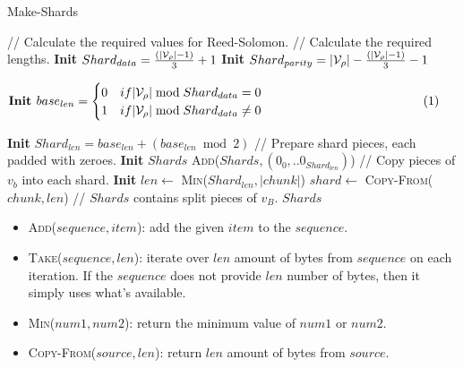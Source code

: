 \begin{algorithm}[H]
  \caption[]{\sc Make-Shards}
  \label{algo-make-shards}
  \begin{algorithmic}[1]
    \Statex // Calculate the required values for Reed-Solomon.
    \Statex // Calculate the required lengths.
    \State \textbf{Init} $Shard_{data} = \frac{(|\mathcal{V}_\rho| - 1)}{3} + 1$
    \State \textbf{Init} $Shard_{parity} = |\mathcal{V}_\rho| - \frac{(|\mathcal{V}_\rho| - 1)}{3} - 1$
    \State $\vcenter{
      \begin{flalign*}
        &\textbf{Init } base_{len} =
        \begin{cases}
          0 & if |\paraValidSet| \bmod{Shard_{data}} = 0 \\
          1 & if |\paraValidSet| \bmod{Shard_{data}} \neq 0
        \end{cases}&
      \end{flalign*}
    }$
    \State \textbf{Init} $Shard_{len} = base_{len} + (base_{len} \bmod{2})$
    \Statex
    \Statex // Prepare shard pieces, each padded with zeroes.
    \State \textbf{Init} $Shards$
      \State \textsc{Add}($Shards, (0_0, ..0_{Shard_{len}})$)
    \EndFor
    \Statex
    \Statex // Copy pieces of $v_b$ into each shard.
      \State \textbf{Init} $len \leftarrow$ \textsc{Min}($Shard_{len}, |chunk|$)
      \State $shard \leftarrow$ \textsc{Copy-From}($chunk, len$)
    \EndFor
    \Statex
    \Statex // $Shards$ contains split pieces of $v_B$.
    \State \Return $Shards$
  \end{algorithmic}
\end{algorithm}

\begin{itemize}
  \item \textsc{Add($sequence, item$)}: add the given $item$ to the $sequence$.
  \item \textsc{Take($sequence, len$)}: iterate over $len$ amount of bytes from
  $sequence$ on each iteration. If the $sequence$ does not provide $len$ number
  of bytes, then it simply uses what's available.
  \item \textsc{Min($num1, num2$)}: return the minimum value of $num1$ or
  $num2$.
  \item \textsc{Copy-From($source, len$)}: return $len$ amount of bytes from
  $source$.
\end{itemize}

